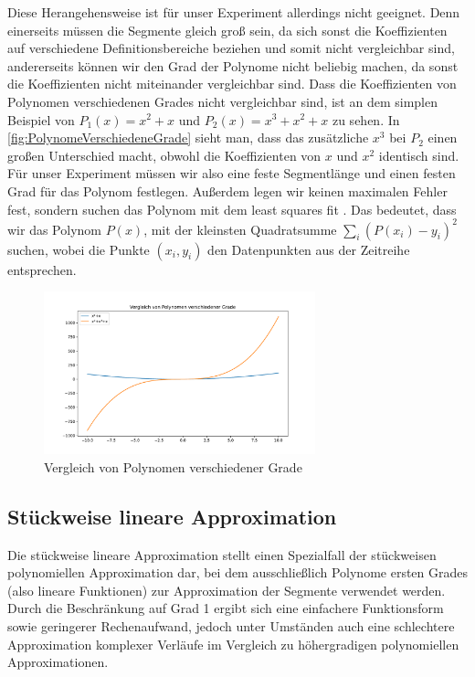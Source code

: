 Diese Herangehensweise ist für unser Experiment allerdings nicht geeignet. Denn einerseits müssen die Segmente gleich groß sein, da sich sonst die Koeffizienten auf verschiedene Definitionsbereiche beziehen und somit nicht vergleichbar sind, andererseits können wir den Grad der Polynome nicht beliebig machen, da sonst die Koeffizienten nicht miteinander vergleichbar sind. Dass die Koeffizienten von Polynomen verschiedenen Grades nicht vergleichbar sind, ist an dem simplen Beispiel von $P_1(x)=x^2+x$ und $P_2(x)=x^3+x^2+x$ zu sehen. In \autoref{fig:PolynomeVerschiedeneGrade} sieht man, dass das zusätzliche $x^3$ bei $P_2$ einen großen Unterschied macht, obwohl die Koeffizienten von $x$ und $x^2$ identisch sind. Für unser Experiment müssen wir also eine feste Segmentlänge und einen festen Grad für das Polynom festlegen. Außerdem legen wir keinen maximalen Fehler fest, sondern suchen das Polynom mit dem least squares fit \cite[Def. least squares fitting]{leastSquares}. Das bedeutet, dass wir das Polynom $P(x)$, mit der kleinsten Quadratsumme $\sum_i (P(x_i)-y_i)^2$ suchen, wobei die Punkte $(x_i,y_i)$ den Datenpunkten aus der Zeitreihe entsprechen.
\begin{figure}[bth] 
  \centering
  \includegraphics[width=0.7\textwidth]{Graphics/ComparissonDifferentPolDegrees.pdf}
  \caption{Vergleich von Polynomen verschiedener Grade}
  \label{fig:PolynomeVerschiedeneGrade}
\end{figure}

\subsection{Stückweise lineare Approximation}
Die stückweise lineare Approximation stellt einen Spezialfall der stückweisen polynomiellen Approximation dar, bei dem ausschließlich Polynome ersten Grades (also lineare Funktionen) zur Approximation der Segmente verwendet werden.
Durch die Beschränkung auf Grad 1 ergibt sich eine einfachere Funktionsform sowie geringerer Rechenaufwand, jedoch unter Umständen auch eine schlechtere Approximation komplexer Verläufe im Vergleich zu höhergradigen polynomiellen Approximationen.

